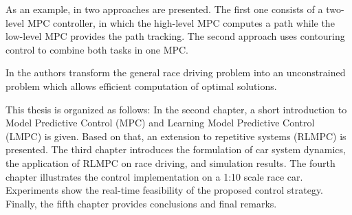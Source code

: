 As an example, in \cite{Liniger2015} two approaches are presented. The first one consists of a two-level MPC controller, in which the high-level MPC computes a path while the low-level MPC provides the path tracking. The second approach uses contouring control to combine both tasks in one MPC.

In \cite{Rucco2015} the authors transform the general race driving problem into an unconstrained problem which allows efficient computation of optimal solutions.

This thesis is organized as follows: In the second chapter, a short introduction to Model Predictive Control (MPC) and Learning Model Predictive Control (LMPC) is given. Based on that, an extension to repetitive systems (RLMPC) is presented. The third chapter introduces the formulation of car system dynamics, the application of RLMPC on race driving, and simulation results. The fourth chapter illustrates the control implementation on a 1:10 scale race car. Experiments show the real-time feasibility of the proposed control strategy. Finally, the fifth chapter provides conclusions and final remarks.
